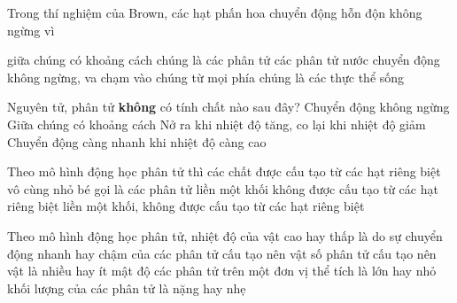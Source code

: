 \begin{ex}%
	Trong thí nghiệm của Brown, các hạt phấn hoa chuyển động hỗn độn không ngừng vì
	
	\choice
	{giữa chúng có khoảng cách}
	{chúng là các phân tử}
	{\True các phân tử nước chuyển động không ngừng, va chạm vào chúng từ mọi phía}
	{chúng là các thực thể sống}
	\end{ex}
\begin{ex}%
	Nguyên tử, phân tử \textbf{không} có tính chất nào sau đây?
	\choice
	{Chuyển động không ngừng}
	{Giữa chúng có khoảng cách}
	{\True Nở ra khi nhiệt độ tăng, co lại khi nhiệt độ giảm}
	{Chuyển động càng nhanh khi nhiệt độ càng cao}
	\end{ex}
\begin{ex}%
	Theo mô hình động học phân tử thì các chất
	\choice
	{\True được cấu tạo từ các hạt riêng biệt vô cùng nhỏ bé gọi là các phân tử}
	{liền một khối}
	{không được cấu tạo từ các hạt riêng biệt}
	{liền một khối, không được cấu tạo từ các hạt riêng biệt}
	\end{ex}
	\begin{ex}%
		Theo mô hình động học phân tử, nhiệt độ của vật cao hay thấp là do
		\choice
		{\True sự chuyển động nhanh hay chậm của các phân tử cấu tạo nên vật}
		{số phân tử cấu tạo nên vật là nhiều hay ít}
		{mật độ các phân tử trên một đơn vị thể tích là lớn hay nhỏ}
		{khối lượng của các phân tử là nặng hay nhẹ}
	\end{ex}
